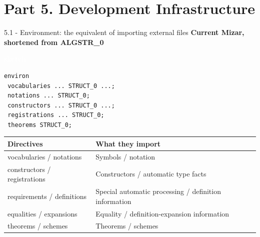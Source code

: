 \documentclass[aspectratio=169,11pt]{beamer}
\newcommand{\statusbadge}[2]{\colorbox{#1}{\textcolor{white}{\strut\scriptsize\sffamily\bfseries #2}}}
\newcommand{\badgeSketch}{\statusbadge{orange!75!black}{sketch}}
\begin{document}
\section{Part 5. Development Infrastructure}
\begin{frame}[fragile,t]{5.1 - Environment: the equivalent of importing external files}
\smallskip
\textbf{Current Mizar, shortened from ALGSTR\_0}~\badgeSketch
\begin{lstlisting}[language={mizar},basicstyle=\ttfamily\small]
environ
 vocabularies ... STRUCT_0 ...;
 notations ... STRUCT_0;
 constructors ... STRUCT_0 ...;
 registrations ... STRUCT_0;
 theorems STRUCT_0;
\end{lstlisting}
\par{}
\begin{footnotesize}
\setlength{\tabcolsep}{3pt}
\renewcommand{\arraystretch}{1.15}
\renewcommand{\arraystretch}{0.93}
\begin{tabularx}{\textwidth}{l>{\raggedright\arraybackslash}X}
\toprule
\textbf{Directives} & \textbf{What they import} \\
\midrule
vocabularies / notations & Symbols / notation \\
constructors / registrations & Constructors / automatic type facts \\
requirements / definitions & Special automatic processing / definition information \\
equalities / expansions & Equality / definition-expansion information \\
theorems / schemes & Theorems / schemes \\
\bottomrule
\end{tabularx}
\end{footnotesize}


\end{frame}
\end{document}
